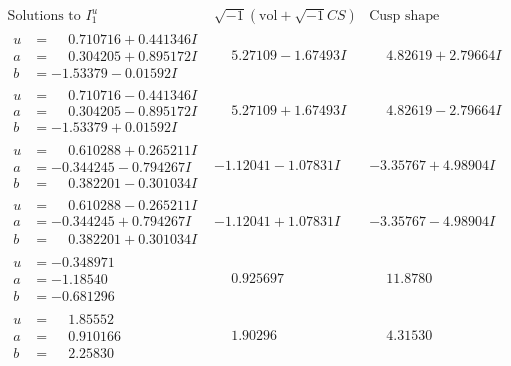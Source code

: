 \documentclass[1p]{elsarticle_modified}
\theoremstyle{definition}
\newcommand{\I}{\sqrt{-1}}
\begin{document}
$$\begin{array}{c|c|c}  
\text{Solutions to }I^u_{1}& \I (\text{vol} + \sqrt{-1}CS) & \text{Cusp shape}\\
 \hline 
\begin{aligned}
u &= \phantom{-}0.710716 + 0.441346 I \\
a &= \phantom{-}0.304205 + 0.895172 I \\
b &= -1.53379 - 0.01592 I\end{aligned}
 & \phantom{-}5.27109 - 1.67493 I & \phantom{-}4.82619 + 2.79664 I \\ \hline\begin{aligned}
u &= \phantom{-}0.710716 - 0.441346 I \\
a &= \phantom{-}0.304205 - 0.895172 I \\
b &= -1.53379 + 0.01592 I\end{aligned}
 & \phantom{-}5.27109 + 1.67493 I & \phantom{-}4.82619 - 2.79664 I \\ \hline\begin{aligned}
u &= \phantom{-}0.610288 + 0.265211 I \\
a &= -0.344245 - 0.794267 I \\
b &= \phantom{-}0.382201 - 0.301034 I\end{aligned}
 & -1.12041 - 1.07831 I & -3.35767 + 4.98904 I \\ \hline\begin{aligned}
u &= \phantom{-}0.610288 - 0.265211 I \\
a &= -0.344245 + 0.794267 I \\
b &= \phantom{-}0.382201 + 0.301034 I\end{aligned}
 & -1.12041 + 1.07831 I & -3.35767 - 4.98904 I \\ \hline\begin{aligned}
u &= -0.348971\phantom{ +0.000000I} \\
a &= -1.18540\phantom{ +0.000000I} \\
b &= -0.681296\phantom{ +0.000000I}\end{aligned}
 & \phantom{-}0.925697\phantom{ +0.000000I} & \phantom{-}11.8780\phantom{ +0.000000I} \\ \hline\begin{aligned}
u &= \phantom{-}1.85552\phantom{ +0.000000I} \\
a &= \phantom{-}0.910166\phantom{ +0.000000I} \\
b &= \phantom{-}2.25830\phantom{ +0.000000I}\end{aligned}
 & \phantom{-}1.90296\phantom{ +0.000000I} & \phantom{-}4.31530\phantom{ +0.000000I} \\ \hline\begin{aligned}

\end{aligned}
\end{array}$$
\end{document}
